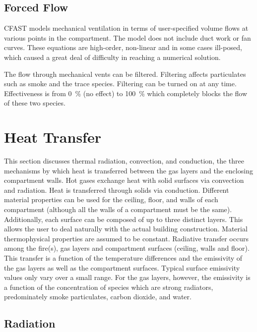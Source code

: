 \documentclass[12pt]{book}
\begin{document}
\section{Forced Flow}

CFAST models mechanical ventilation in terms of user-specified volume flows at various points in the compartment. The model does not include duct work or fan curves. These equations are high-order, non-linear and in some cases ill-posed, which caused a great deal of difficulty in reaching a numerical solution.

The flow through mechanical vents can be filtered. Filtering affects particulates such as smoke and the trace species. Filtering can be turned on at any time. Effectiveness is from 0~\% (no effect) to 100~\% which completely blocks the flow of these two species.





\chapter{Heat Transfer}

This section discusses thermal radiation, convection, and conduction, the three mechanisms by which heat is transferred between the gas layers and the enclosing compartment walls. Hot gases exchange heat with solid surfaces via convection and radiation. Heat is transferred through solids via conduction. Different material properties can be used for the ceiling, floor, and walls of each compartment (although all the walls of a compartment must be the same).  Additionally, each surface can be composed of up to three distinct layers.  This allows the user to deal naturally with the actual building construction.  Material thermophysical properties are assumed to be constant. Radiative transfer occurs among the fire(s), gas layers and compartment surfaces (ceiling, walls and floor).  This transfer is a function of the temperature differences and the emissivity of the gas layers as well as the compartment surfaces.  Typical surface emissivity values only vary over a small range.  For the gas layers, however, the emissivity is a function of the concentration of species which are strong radiators, predominately smoke particulates, carbon dioxide, and water.

\section{Radiation}
\label{sec:Radiation}
\end{document}
